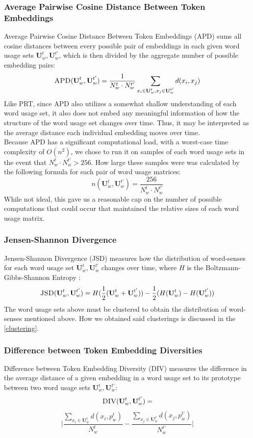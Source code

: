 \documentclass[10pt, a4paper]{article}
\begin{document}
\subsubsection{Average Pairwise Cosine Distance Between Token Embeddings}
Average Pairwise Cosine Distance Between Token Embeddings (APD) sums all cosine distances between every possible pair of embeddings in each given word usage sets $\textbf{U}^{t}_w, \textbf{U}^{t'}_w$, which is then divided by the aggregate number of possible embedding pairs:
$$\textsc{APD}(\textbf{U}^{t}_w, \textbf{U}^{t'}_w) = \frac{1}{N^{t}_w \cdot N^{t'}_w} \sum_{x_i \in \textbf{U}^{t}_w, x_j \in \textbf{U}^{t'}_w} d(x_i, x_j)$$
Like PRT, since APD also utilizes a somewhat shallow understanding of each word usage set, it also does not embed any meaningful information of how the structure of the word usage set changes over time. Thus, it may be interpreted as the average distance each individual embedding moves over time.\\

Because APD has a significant computational load, with a worst-case time complexity of $O(n^2)$, we chose to run it on samples of each word usage sets in the event that $N^{t}_w \cdot N^{t'}_w > 256$. How large these samples were was calculated by the following formula for each pair of word usage matrices:
$$n(\textbf{U}^{t}_w, \textbf{U}^{t'}_w) = \frac{256}{N^{t}_w \cdot N^{t'}_w}$$
While not ideal, this gave us a reasonable cap on the number of possible computations that could occur that maintained the relative sizes of each word usage matrix. %

\subsubsection{Jensen-Shannon Divergence}
\label{JSD}
Jensen-Shannon Divergence (JSD) measures how the distribution of word-senses for each word usage set $\textbf{U}^{t}_w, \textbf{U}^{t'}_w$ changes over time, where $H$ is the Boltzmann-Gibbs-Shannon Entropy \cite{jensenshannon}:
\small $$\textsc{JSD}(\textbf{U}^{t}_w, \textbf{U}^{t'}_w) = H(\frac{1}{2}(\textbf{U}^{t}_w + \textbf{U}^{t'}_w)) - \frac{1}{2}(H(\textbf{U}^{t}_w) - H(\textbf{U}^{t'}_w))$$
The word usage sets above must be clustered to obtain the distribution of word-senses mentioned above. How we obtained said clusterings is discussed in the \ref{clustering}.
\subsubsection{Difference between Token Embedding Diversities}
Difference between Token Embedding Diversity (DIV) measures the difference in the average distance of a given embedding in a word usage set to its prototype between two word usage sets $\textbf{U}^{t}_w, \textbf{U}^{t'}_w$:
$$\textsc{DIV}(\textbf{U}^{t}_w, \textbf{U}^{t'}_w) = $$ 
$$\Bigg | \frac{\sum_{x_i \in \textbf{U}^{t}_w} d(x_i, p^{t}_w)}{N^{t}_w} - \frac{\sum_{x_j \in \textbf{U}^{t'}_w} d(x_j, p^{t'}_w)}{N^{t'}_w} \Bigg |$$
\end{document}
